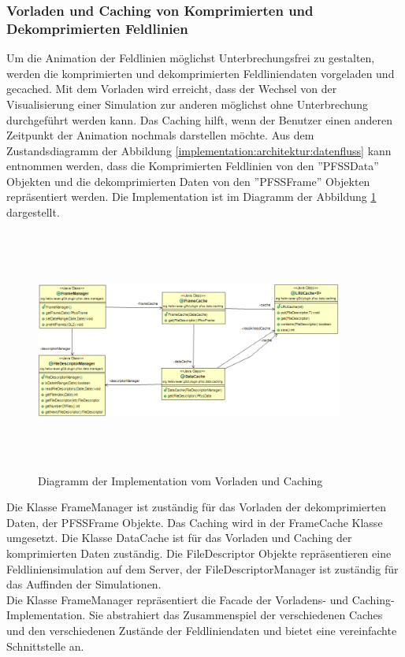 \subsubsection{Vorladen und Caching von Komprimierten und Dekomprimierten Feldlinien}
Um die Animation der Feldlinien möglichst Unterbrechungsfrei zu gestalten, werden die komprimierten und dekomprimierten Feldliniendaten vorgeladen und gecached. Mit dem Vorladen wird erreicht, dass der Wechsel von der Visualisierung einer Simulation zur anderen möglichst ohne Unterbrechung durchgeführt werden kann. Das Caching hilft, wenn der Benutzer einen anderen Zeitpunkt der Animation nochmals darstellen möchte. Aus dem Zustandsdiagramm der Abbildung \ref{implementation:architektur:datenfluss} kann entnommen werden, dass die Komprimierten Feldlinien von den ''PFSSData'' Objekten und die dekomprimierten Daten von den ''PFSSFrame'' Objekten repräsentiert werden. Die Implementation ist im Diagramm der Abbildung \ref{implementation:architektur:caching} dargestellt.
\begin{figure}[!htbp]
	\center
	\includegraphics[width=0.9\textwidth,height=8cm,keepaspectratio]{./pictures/implementation/architectureCache.png}
	\caption{Diagramm der Implementation vom Vorladen und Caching}
	\label{implementation:architektur:caching}
\end{figure}
Die Klasse FrameManager ist zuständig für das Vorladen der dekomprimierten Daten, der PFSSFrame Objekte. Das Caching wird in der FrameCache Klasse umgesetzt. Die Klasse DataCache ist für das Vorladen und Caching der komprimierten Daten zuständig. Die FileDescriptor Objekte repräsentieren eine Feldliniensimulation auf dem Server, der FileDescriptorManager ist zuständig für das Auffinden der Simulationen.\\
Die Klasse FrameManager repräsentiert die Facade der Vorladens- und Caching- Implementation. Sie abstrahiert das Zusammenspiel der verschiedenen Caches und den verschiedenen Zustände der Feldliniendaten und bietet eine vereinfachte Schnittstelle an.\\
